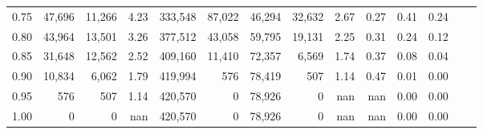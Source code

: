 \begin{tabular}{rrrrrrrrrrrrrr}
0.75 &  47,696 &  11,266 &    4.23 &  333,548 &   87,022 &  46,294 &  32,632 &  2.67 &  0.27 &  0.41 &      0.24 \\
0.80 &  43,964 &  13,501 &    3.26 &  377,512 &   43,058 &  59,795 &  19,131 &  2.25 &  0.31 &  0.24 &      0.12 \\
0.85 &  31,648 &  12,562 &    2.52 &  409,160 &   11,410 &  72,357 &   6,569 &  1.74 &  0.37 &  0.08 &      0.04 \\
0.90 &  10,834 &   6,062 &    1.79 &  419,994 &      576 &  78,419 &     507 &  1.14 &  0.47 &  0.01 &      0.00 \\
0.95 &     576 &     507 &    1.14 &  420,570 &        0 &  78,926 &       0 &   nan &   nan &  0.00 &      0.00 \\
1.00 &       0 &       0 &     nan &  420,570 &        0 &  78,926 &       0 &   nan &   nan &  0.00 &      0.00 \\
\bottomrule
\end{tabular}
